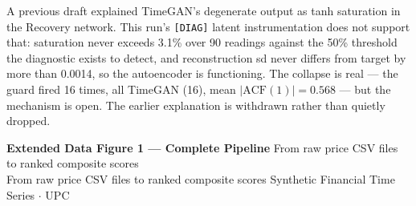 \documentclass[10pt]{article}
\newcommand{\pagehead}[2]{%
  \begin{tcolorbox}[enhanced,arc=0pt,outer arc=0pt,boxrule=0pt,
    colback=Navy,colframe=Navy,
    top=5pt,bottom=5pt,left=8pt,right=8pt,
    before skip=0pt,after skip=10pt]
  {\color{white}\large\bfseries #1}%
  \ifx\relax#2\relax\else\\[1pt]{\color{blue!30!white}\small #2}\fi
  \hfill{\color{blue!20!white}\footnotesize Synthetic Financial Time Series $\cdot$ UPC}
  \end{tcolorbox}}
\newcommand{\auditrow}[5]{%
  \begin{tcolorbox}[mybox={#2}{#3},
    title={\textbf{[#1]}\quad #4},
    before skip=4pt, after skip=4pt, breakable]
  \small #5
  \end{tcolorbox}}
\begin{document}
\auditrow{WITHDRAWN}{Amber}{ABg}%
  {Earlier attribution of TimeGAN's collapse to tanh saturation}%
  {A previous draft explained TimeGAN's degenerate output as tanh saturation in the Recovery network. This run's \texttt{[DIAG]} latent instrumentation does not support that: saturation never exceeds 3.1\% over 90 readings against the 50\% threshold the diagnostic exists to detect, and reconstruction sd never differs from target by more than 0.0014, so the autoencoder is functioning. The collapse is real --- the guard fired 16 times, all TimeGAN (16), mean $|\text{ACF}(1)| = 0.568$ --- but the mechanism is open. The earlier explanation is withdrawn rather than quietly dropped.}

\clearpage

\pagehead{Extended Data Figure 1 --- Complete Pipeline}
         {From raw price CSV files to ranked composite scores}
\end{document}
